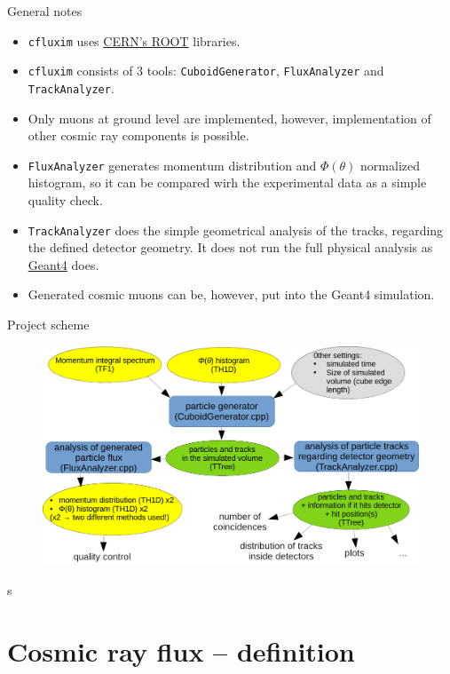 \documentclass{beamer}
\begin{document}
\begin{frame}{General notes}
\begin{itemize}
\item \texttt{cfluxim} uses \textcolor{blue}{\href{https://root.cern/}{CERN's ROOT}} libraries.
\item \texttt{cfluxim} consists of 3 tools: \texttt{CuboidGenerator}, \texttt{FluxAnalyzer} and \texttt{TrackAnalyzer}.
\item Only muons at ground level are implemented, however, implementation of other cosmic ray components is possible.
\item \texttt{FluxAnalyzer} generates momentum distribution and $\Phi(\theta)$ normalized histogram, so it can be compared wirh the experimental data as a simple quality check.
\item \texttt{TrackAnalyzer} does the simple geometrical analysis of the tracks, regarding the defined detector geometry. It does not run the full physical analysis as \textcolor{blue}{\href{https://geant4.web.cern.ch/}{Geant4}} does.
\item Generated cosmic muons can be, however, put into the Geant4 simulation.
\end{itemize}
\end{frame}

\begin{frame}{Project scheme}
\begin{figure}
\includegraphics[width=\textwidth]{images/sim_scheme.png}
\end{figure}
s\end{frame}


\section{Cosmic ray flux -- definition}
\end{document}
